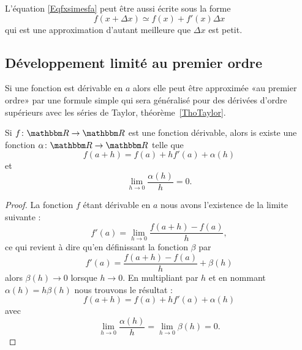L'équation \eqref{Eqfxsimesfa} peut être aussi écrite sous la forme
\begin{equation}		\label{EqfxdxSimeqfxfpx}
	f(x+\Delta x)\simeq f(x)+f'(x)\Delta x
\end{equation}
qui est une approximation d'autant meilleure que $\Delta x$ est petit.

\subsection{Développement limité au premier ordre}

Si une fonction est dérivable en \( a\) alors elle peut être approximée «au premier ordre» par une formule simple qui sera généralisé pour des dérivées d'ordre supérieurs avec les séries de Taylor, théorème~\ref{ThoTaylor}.
\begin{proposition}  \label{PropUTenzfQ}
    Si \( f\colon \eR\to \eR\) est une fonction dérivable, alors is existe une fonction \( \alpha\colon \eR\to \eR\) telle que
    \begin{equation}
        f(a+h)=f(a)+hf'(a)+\alpha(h)
    \end{equation}
    et
    \begin{equation}
        \lim_{h\to 0} \frac{ \alpha(h) }{ h }=0.
    \end{equation}
\end{proposition}

\begin{proof}
    La fonction \( f\) étant dérivable en \( a\) nous avons l'existence de la limite suivante :
    \begin{equation}
        f'(a)=\lim_{h\to 0} \frac{ f(a+h)-f(a) }{ h },
    \end{equation}
    ce qui revient à dire qu'en définissant la fonction \( \beta\) par
    \begin{equation}
        f'(a)=\frac{ f(a+h)-f(a) }{ h }+\beta(h)
    \end{equation}
    alors \( \beta(h)\to 0\) lorsque \( h\to 0\). En multipliant par \( h\) et en nommant \( \alpha(h)=h\beta(h)\) nous trouvons le résultat :
    \begin{equation}
        f(a+h)=f(a)+hf'(a)+\alpha(h)
    \end{equation}
    avec
    \begin{equation}
        \lim_{h\to 0} \frac{ \alpha(h) }{ h }=\lim_{h\to 0} \beta(h)=0.
    \end{equation}
\end{proof}

